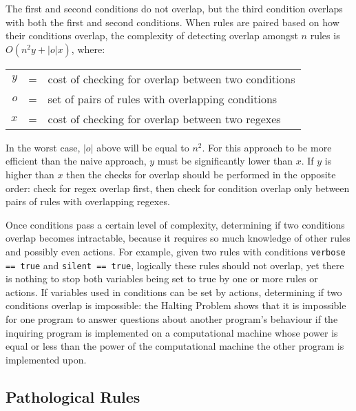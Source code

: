 \noindent{}The first and second conditions do not overlap, but the third
condition overlaps with both the first and second conditions.  When rules
are paired based on how their conditions overlap, the complexity of
detecting overlap amongst $n$ rules is $O\left(n^{2}y+|o|x\right)$, where:

\begin{tabular}[]{rcl}

    $y$ & = & cost of checking for overlap between two conditions \\
    $o$ & = & set of pairs of rules with overlapping conditions   \\
    $x$ & = & cost of checking for overlap between two regexes    \\

\end{tabular}

In the worst case, $|o|$ above will be equal to $n^{2}$.  For this approach
to be more efficient than the naive approach, $y$ must be significantly
lower than $x$.  If $y$ is higher than $x$ then the checks for overlap
should be performed in the opposite order: check for regex overlap first,
then check for condition overlap only between pairs of rules with
overlapping regexes.

Once conditions pass a certain level of complexity, determining if two
conditions overlap becomes intractable, because it requires so much
knowledge of other rules and possibly even actions.  For example, given two
rules with conditions \verb!verbose == true! and \verb!silent == true!,
logically these rules should not overlap, yet there is nothing to stop both
variables being set to true by one or more rules or actions.  If variables
used in conditions can be set by actions, determining if two conditions
overlap is impossible: the Halting Problem shows that it is impossible for
one program to answer questions about another program's behaviour if the
inquiring program is implemented on a computational machine whose power is
equal or less than the power of the computational machine the other program
is implemented upon.

\subsection{Pathological Rules}

